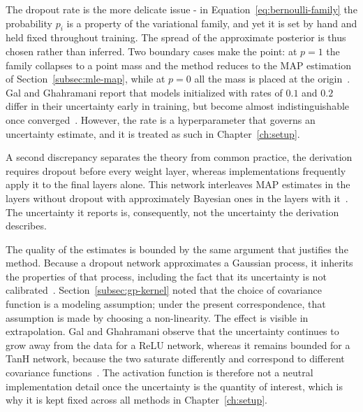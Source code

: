 The dropout rate is the more delicate issue - in Equation~\eqref{eq:bernoulli-family} the probability $p_i$ is a property of the variational family, and yet it is set by hand and held fixed throughout training. The spread of the approximate posterior is thus chosen rather than inferred. Two boundary cases make the point: at $p = 1$ the family collapses to a point mass and the method reduces to the MAP estimation of Section~\ref{subsec:mle-map}, while at $p = 0$ all the mass is placed at the origin~\cite{lefolgoc2021}. Gal and Ghahramani report that models initialized with rates of $0.1$ and $0.2$ differ in their uncertainty early in training, but become almost indistinguishable once converged~\cite{gal2016}. However, the rate is a hyperparameter that governs an uncertainty estimate, and it is treated as such in Chapter~\ref{ch:setup}.

A second discrepancy separates the theory from common practice, the derivation requires dropout before every weight layer, whereas implementations frequently apply it to the final layers alone. This network interleaves MAP estimates in the layers without dropout with approximately Bayesian ones in the layers with it~\cite{gal2016appendix}. The uncertainty it reports is, consequently, not the uncertainty the derivation describes.

The quality of the estimates is bounded by the same argument that justifies the method. Because a dropout network approximates a Gaussian process, it inherits the properties of that process, including the fact that its uncertainty is not calibrated~\cite{gal2016appendix}. Section~\ref{subsec:gp-kernel} noted that the choice of covariance function is a modeling assumption; under the present correspondence, that assumption is made by choosing a non-linearity. The effect is visible in extrapolation. Gal and Ghahramani observe that the uncertainty continues to grow away from the data for a ReLU network, whereas it remains bounded for a TanH network, because the two saturate differently and correspond to different covariance functions~\cite{gal2016}. The activation function is therefore not a neutral implementation detail once the uncertainty is the quantity of interest, which is why it is kept fixed across all methods in Chapter~\ref{ch:setup}.

